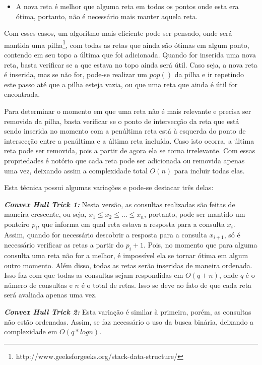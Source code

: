 \begin{itemize}[leftmargin=-.001in]
\begin{itemize}
\item A nova reta é melhor que alguma reta em todos os pontos onde esta era ótima, portanto, não é necessário mais manter aquela reta.
\end{itemize}

Com esses casos, um algoritmo mais eficiente pode ser pensado, onde será mantida uma pilha\footnote{http://www.geeksforgeeks.org/stack-data-structure/}, com todas as retas que ainda são ótimas em algum ponto, contendo em seu topo a última que foi adicionada. Quando for inserida uma nova reta, basta verificar se a que estava no topo ainda será útil. Caso seja, a nova reta é inserida, mas se não for, pode-se realizar um $pop()$ da pilha e ir repetindo este passo até que a pilha esteja vazia, ou que uma reta que ainda é útil for encontrada.

Para determinar o momento em que uma reta não é mais relevante e precisa ser removida da pilha, basta verificar se o ponto de intersecção da reta que está sendo inserida no momento com a penúltima reta está à esquerda do ponto de intersecção entre a penúltima e a última reta incluída. Caso isto ocorra, a última reta pode ser removida, pois a partir de agora ela se torna irrelevante. Com essas propriedades é notório que cada reta pode ser adicionada ou removida apenas uma vez, deixando assim a complexidade total $O(n)$ para incluir todas elas.

Esta técnica possui algumas variações e pode-se destacar três delas:

\textit{\textbf{Convex Hull Trick 1:}}  Nesta versão, as consultas realizadas são feitas de maneira crescente, ou seja, $x_{1} \leq x_{2} \leq ... \leq x_{n}$, portanto, pode ser mantido um ponteiro $p_{i}$, que informa em qual reta estava a resposta para a consulta $x_{i}$. Assim, quando for necessário descobrir a resposta para a consulta $x_{i+1}$, só é necessário verificar as retas a partir do $p_{i} + 1$. Pois, no momento que para alguma consulta uma reta não for a melhor, é impossível ela se tornar ótima em algum outro momento. Além disso, todas as retas serão inseridas de maneira ordenada. Isso faz com que todas as consultas sejam respondidas em $O(q + n)$, onde $q$ é o número de consultas e $n$ é o total de retas. Isso se deve ao fato de que cada reta será avaliada apenas uma vez.

\textit{\textbf{Convex Hull Trick 2:}} Esta variação é similar à primeira, porém, as consultas não estão ordenadas. Assim, se faz necessário o uso da busca binária, deixando a complexidade em $O(q*log n)$.


\end{itemize}
